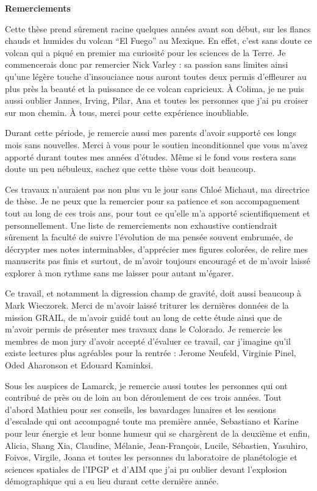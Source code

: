 \thispagestyle{plain}
\begin{flushleft}
 \Large
 \vspace{.5cm}
 \textbf{Remerciements}
\end{flushleft}

Cette thèse prend sûrement racine quelques années avant son début, sur
les flancs chauds et humides du volcan ``El Fuego'' au Mexique. En
effet, c’est sans doute ce volcan qui a piqué en premier ma curiosité
pour les sciences de la Terre. Je commencerais donc par remercier Nick
Varley : sa passion sans limites ainsi qu’une légère touche
d’insouciance nous auront toutes deux permis d’effleurer au plus près
la beauté et la puissance de ce volcan capricieux. À Colima, je ne
puis aussi oublier Jannes, Irving, Pilar, Ana et toutes les personnes
que j’ai pu croiser sur mon chemin. À tous, merci pour cette
expérience inoubliable.

Durant cette période, je remercie aussi mes parents d’avoir supporté
ces longs mois sans nouvelles. Merci à vous pour le soutien
inconditionnel que vous m’avez apporté durant toutes mes années
d’études. Même si le fond vous restera sans doute un peu nébuleux,
sachez que cette thèse vous doit beaucoup.

Ces travaux n’auraient pas non plus vu le jour sans Chloé Michaut, ma
directrice de thèse. Je ne peux que la remercier pour sa patience et
son accompagnement tout au long de ces trois ans, pour tout ce qu’elle
m’a apporté scientifiquement et personnellement. Une liste de
remerciements non exhaustive contiendrait sûrement la faculté de suivre
l’évolution de ma pensée souvent embrumée, de décrypter mes notes
interminables, d’apprécier mes figures colorées, de relire mes
manuscrits pas finis et surtout, de m’avoir toujours encouragé et de
m’avoir laissé explorer à mon rythme sans me laisser pour autant
m’égarer.

Ce travail,  et notamment la  digression champ de gravité,  doit aussi
beaucoup  à  Mark Wieczorek.  Merci  de  m’avoir laissé  triturer  les
dernières données de  la mission GRAIL, de m’avoir guidé  tout au long
de cette  étude ainsi que de  m’avoir permis de présenter  mes travaux
dans le Colorado. Je remercie les  membres de mon jury d’avoir accepté
d’évaluer  ce  travail,  car  j’imagine  qu’il  existe  lectures  plus
agréables  pour la  rentrée  : Jerome  Neufeld,  Virginie Pinel,  Oded
Aharonson et Edouard Kaminksi.

Sous les auspices  de Lamarck, je remercie aussi  toutes les personnes
qui ont contribué de  près ou de loin au bon  déroulement de ces trois
années.   Tout  d’abord  Mathieu  pour ses  conseils,  les  bavardages
lunaires  et  les sessions  d’escalade  qui  ont accompagné  toute  ma
première année, Sebastiano  et Karine pour leur énergie  et leur bonne
humeur qui se  chargèrent de la deuxième et enfin,  Alicia, Shang Xia,
Claudine, Mélanie, Jean-François, Lucile, Sébastien, Yasuhiro, Foivos,
Virgile,   Joana  et   toutes  les   personnes  du   laboratoire  de
planétologie  et sciences  spatiales de  l’IPGP et  d'AIM que  j’ai pu
oublier devant  l’explosion démographique qui  a eu lieu  durant cette
dernière année.


